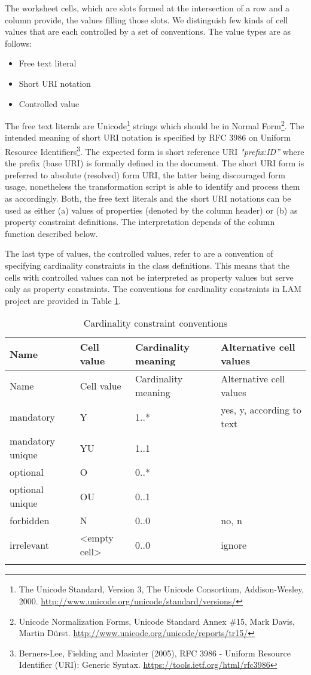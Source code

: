The worksheet cells, which are slots formed at the intersection of a row
and a column provide, the values filling those slots. We distinguish few
kinds of cell values that are each controlled by a set of conventions. The value
types are as follows:

\begin{itemize}

\item
  Free text literal
\item
  Short URI notation
\item
  Controlled value
\end{itemize}

The free text literals are
Unicode\footnote{The Unicode Standard,
	Version 3, The Unicode Consortium, Addison-Wesley, 2000.
	\mbox{\url{http://www.unicode.org/unicode/standard/versions/}} } strings which
should be in Normal Form\footnote{Unicode Normalization
	Forms, Unicode Standard Annex \#15, Mark Davis, Martin Dürst.
	\href{http://www.unicode.org/unicode/reports/tr15/\%20}{http://www.unicode.org/unicode/reports/tr15/}}. The intended meaning
of short URI notation is specified by RFC 3986 on Uniform Resource
Identifiers\footnote{Berners-Lee, Fielding
	and Masinter (2005), RFC 3986 - Uniform Resource Identifier (URI):
	Generic Syntax. \url{https://tools.ietf.org/html/rfc3986}}. The
expected form is short reference URI \emph{"prefix:ID'' } where the
prefix (base URI) is formally defined in the document. The short URI
form is preferred to absolute (resolved) form URI, the latter being
discouraged form usage, nonetheless the transformation script is able to
identify and process them as accordingly. Both, the free text literals
and the short URI notations can be used as either (a) values of
properties (denoted by the column header) or (b) as property constraint
definitions. The interpretation depends of the column function described
below.

The last type of values, the controlled values, refer to are a
convention of specifying cardinality constraints in the class
definitions. This means that the cells with controlled values can not be
interpreted as property values but serve only as property constraints.
The conventions for cardinality constraints in LAM project are provided
in Table \ref{tab:cardinality}.

\begin{longtable}[!ht]{@{}p{3.4cm}p{3cm}p{2cm}p{4.5cm}@{}}
\toprule
Name & Cell value & Cardinality meaning & Alternative cell
values\tabularnewline
\midrule
\endfirsthead
\toprule
Name & Cell value & Cardinality meaning & Alternative cell
values\tabularnewline
\midrule
\endhead
mandatory & Y & 1..* & yes, y, according to text\tabularnewline
mandatory unique & YU & 1..1 &\tabularnewline
optional & O & 0..* &\tabularnewline
optional unique & OU & 0..1 &\tabularnewline
forbidden & N & 0..0 & no,
n\tabularnewline
irrelevant & \textless{}empty cell\textgreater{} & 0..0 & ignore\tabularnewline
\bottomrule
\caption{Cardinality constraint conventions}
\label{tab:cardinality}
\vspace{-20pt}
\end{longtable}

